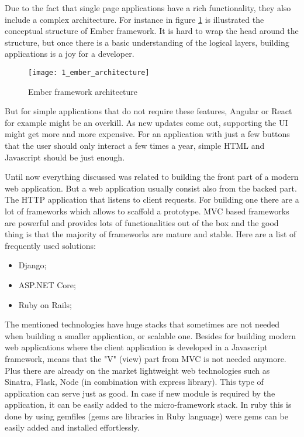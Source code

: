 Due to the fact that single page applications have a rich functionality, they also include a complex architecture. For instance in figure \mbox{\ref{ember_architecture}} is illustrated the conceptual structure of Ember framework. It is hard to wrap the head around the structure, but once there is a basic understanding of the logical layers, building applications is a joy for a developer.

\begin{figure}[!ht]
\centering
\texttt{[image: 1\_ember\_architecture]}
\caption{Ember framework architecture}\label{ember_architecture}
\end{figure}

But for simple applications that do not require these features, Angular or React for example might be an overkill. As new updates come out, supporting the UI might get more and more expensive. For an application with just a few buttons that the user should only interact a few times a year, simple HTML and Javascript should be just enough.

Until now everything discussed was related to building the front part of a modern web application. But a web application usually consist also from the backed part. The HTTP application that listens to client requests. For building one there are a lot of frameworks which allows to scaffold a prototype. MVC based frameworks are powerful and provides lots of functionalities out of the box and the good thing is that the majority of frameworks are mature and stable. Here are a list of frequently used solutions:
\begin{itemize}
    \item Django;
    \item ASP.NET Core;
    \item Ruby on Rails;
\end{itemize}

The mentioned technologies have huge stacks that sometimes are not needed when building a smaller application, or scalable one. Besides for building modern web applications where the client application is developed in a Javascript framework, means that the "V" (view) part from MVC is not needed anymore. Plus there are already on the market lightweight web technologies such as Sinatra, Flask, Node (in combination with express library). This type of application can serve just as good. In case if new module is required by the application, it can be easily added to the micro-framework stack. In ruby this is done by using gemfiles (gems are libraries in Ruby language) were gems can be easily added and installed effortlessly.

